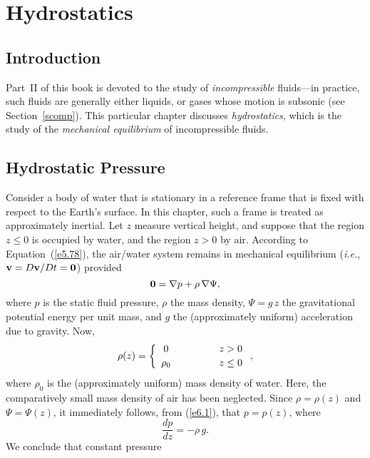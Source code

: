 \chapter{Hydrostatics}\label{c6}
\section{Introduction}
Part~II of this book is devoted to the study of {\em incompressible}\/ fluids---in practice, such fluids are  generally  either liquids, or gases whose
motion is subsonic (see Section~\ref{scomp}). 
This particular chapter discusses {\em hydrostatics}, which is the study of the {\em mechanical equilibrium}\/ of incompressible fluids. 

\section{Hydrostatic Pressure}\label{s6.2}
Consider a    body of water that is stationary   in a reference frame that is fixed with respect to the Earth's surface. In this chapter, such a  frame is
treated as approximately inertial.  Let $z$ measure vertical height, and suppose that the region $z\leq 0$ is occupied
by water, and the region $z>0$  by air. 
According to Equation~(\ref{e5.78}), the air/water system remains in mechanical equilibrium  ({\em i.e.}, ${\bf v} = D{\bf v}/Dt= {\bf 0}$) provided
\begin{equation}\label{e6.1}
{\bf 0} = \nabla p + \rho\,\nabla\Psi,
\end{equation}
where $p$ is the static fluid pressure, $\rho$ the mass density,  $\Psi=g\,z$ the gravitational potential energy per unit mass,  and $g$
the (approximately uniform) acceleration due to gravity.
Now,
\begin{equation}\label{e6.2}
\rho(z) = \left\{ \begin{array}{ccc}
0&\mbox{\hspace{1cm}}&z>0\\[0.5ex]
\rho_0&&z\leq 0
\end{array}\right.,
\end{equation}
where $\rho_0$ is the (approximately uniform) mass density of water. Here, the comparatively small mass density of air has been neglected. Since $\rho=\rho(z)$ and $\Psi=\Psi(z)$, it immediately follows, from (\ref{e6.1}), that $p=p(z)$,
where
\begin{equation}\label{e6.3}
\frac{dp}{dz} = -\rho\,g.
\end{equation}
 We conclude that constant pressure
